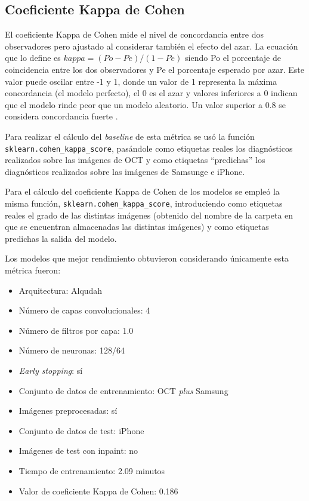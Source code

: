 \subsection{Coeficiente Kappa de Cohen}

El coeficiente Kappa de Cohen mide el nivel de concordancia entre dos observadores pero ajustado al considerar también el efecto del azar. La ecuación que lo define es $kappa = (Po - Pe) / (1 - Pe)$ siendo Po el porcentaje de coincidencia entre los dos observadores y Pe el porcentaje esperado por azar. Este valor puede oscilar entre -1 y 1, donde un valor de 1 representa la máxima concordancia (el modelo perfecto), el 0 es el azar y valores inferiores a 0 indican que el modelo rinde peor que un modelo aleatorio. Un valor superior a 0.8 se considera concordancia fuerte \cite{sklearn:kappa}.

Para realizar el cálculo del \textit{baseline} de esta métrica se usó la función \texttt{sklearn.cohen\_kappa\_score}, pasándole como etiquetas reales los diagnósticos realizados sobre las imágenes de OCT y como etiquetas ``predichas'' los diagnósticos realizados sobre las imágenes de Samsunge e iPhone.

Para el cálculo del coeficiente Kappa de Cohen de los modelos se empleó la misma función, \texttt{sklearn.cohen\_kappa\_score}, introduciendo como etiquetas reales el grado de las distintas imágenes (obtenido del nombre de la carpeta en que se encuentran almacenadas las distintas imágenes) y como etiquetas predichas la salida del modelo.

Los modelos que mejor rendimiento obtuvieron considerando únicamente esta métrica fueron:

\begin{itemize}
    \item Arquitectura: Alqudah
    \item Número de capas convolucionales: 4
    \item Número de filtros por capa: 1.0
    \item Número de neuronas: 128/64
    \item \textit{Early stopping}: sí
    \item Conjunto de datos de entrenamiento: OCT \textit{plus} Samsung
    \item Imágenes preprocesadas: sí
    \item Conjunto de datos de test: iPhone
    \item Imágenes de test con inpaint: no
    \item Tiempo de entrenamiento: 2.09 minutos
    \item Valor de coeficiente Kappa de Cohen: 0.186
\end{itemize}

